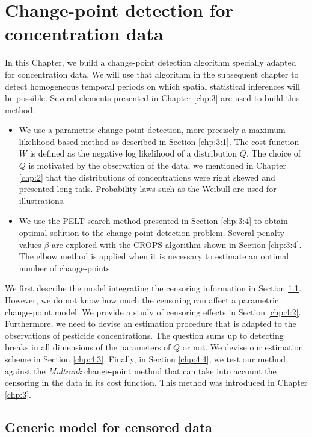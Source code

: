 \chapter{Change-point detection for concentration data}\label{chp:4}

\minitoc

\clearpage

In this Chapter, we build a change-point detection algorithm specially adapted for concentration data. We will use that algorithm in the subsequent chapter to detect homogeneous temporal periods on which spatial statistical inferences will be possible. Several elements presented in Chapter \ref{chp:3} are used to build this method:  
\begin{itemize}
\item We use a parametric change-point detection, more precisely a maximum likelihood based method as described in Section \ref{chp:3:1}. The cost function $W$ is defined as the negative log likelihood of a distribution $Q$. The choice of $Q$ is motivated by the observation of the data, we mentioned in Chapter \ref{chp:2} that the distributions of concentrations were right skewed and presented long tails. Probability laws such as the Weibull are used for illustrations.  
\item We use the PELT search method presented in Section \ref{chp:3:4} to obtain optimal solution to the change-point detection problem. Several penalty values $\beta$ are explored with the CROPS algorithm shown in Section \ref{chp:3:4}. The elbow method is applied when it is necessary to estimate an optimal number of change-points.   
\end{itemize}
We first describe the model integrating the censoring information in Section \ref{chp:4:1}. However, we do not know how much the censoring can affect a parametric change-point model. We provide a study of censoring effects in Section \ref{chp:4:2}. Furthermore, we need to devise an estimation procedure that is adapted to the observations of pesticide concentrations. The question sums up to detecting breaks in all dimensions of the parameters of $Q$ or not. We devise our estimation scheme in Section \ref{chp:4:3}. Finally, in Section \ref{chp:4:4}, we test our method against the \textit{Multrank} change-point method that can take into account the censoring in the data in its cost function. This method was introduced in Chapter \ref{chp:3}. 


\section{Generic model for censored data}\label{chp:4:1}

